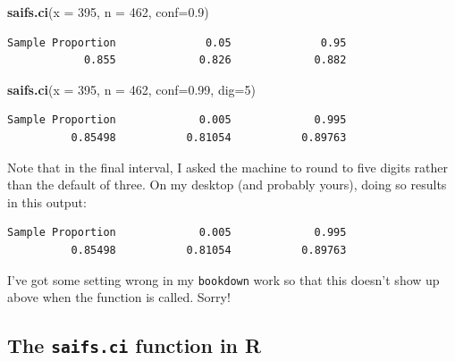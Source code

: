 \documentclass[
]{book}
\newenvironment{Shaded}{\begin{snugshade}}{\end{snugshade}}
\newcommand{\DataTypeTok}[1]{\textcolor[rgb]{0.13,0.29,0.53}{#1}}
\newcommand{\DecValTok}[1]{\textcolor[rgb]{0.00,0.00,0.81}{#1}}
\newcommand{\FloatTok}[1]{\textcolor[rgb]{0.00,0.00,0.81}{#1}}
\newcommand{\KeywordTok}[1]{\textcolor[rgb]{0.13,0.29,0.53}{\textbf{#1}}}
\newcommand{\NormalTok}[1]{#1}
\begin{document}
\begin{Shaded}
\begin{Highlighting}[]
\KeywordTok{saifs.ci}\NormalTok{(}\DataTypeTok{x =} \DecValTok{395}\NormalTok{, }\DataTypeTok{n =} \DecValTok{462}\NormalTok{, }\DataTypeTok{conf=}\FloatTok{0.9}\NormalTok{)}
\end{Highlighting}
\end{Shaded}

\begin{verbatim}
Sample Proportion              0.05              0.95 
            0.855             0.826             0.882 
\end{verbatim}

\begin{Shaded}
\begin{Highlighting}[]
\KeywordTok{saifs.ci}\NormalTok{(}\DataTypeTok{x =} \DecValTok{395}\NormalTok{, }\DataTypeTok{n =} \DecValTok{462}\NormalTok{, }\DataTypeTok{conf=}\FloatTok{0.99}\NormalTok{, }\DataTypeTok{dig=}\DecValTok{5}\NormalTok{)}
\end{Highlighting}
\end{Shaded}

\begin{verbatim}
Sample Proportion             0.005             0.995 
          0.85498           0.81054           0.89763 
\end{verbatim}

Note that in the final interval, I asked the machine to round to five digits rather than the default of three. On my desktop (and probably yours), doing so results in this output:

\begin{verbatim}
Sample Proportion             0.005             0.995 
          0.85498           0.81054           0.89763 
\end{verbatim}

I've got some setting wrong in my \texttt{bookdown} work so that this doesn't show up above when the function is called. Sorry!

\hypertarget{the-saifs.ci-function-in-r}{%
\subsection{\texorpdfstring{The \texttt{saifs.ci} function in R}{The saifs.ci function in R}}\label{the-saifs.ci-function-in-r}}
\end{document}

